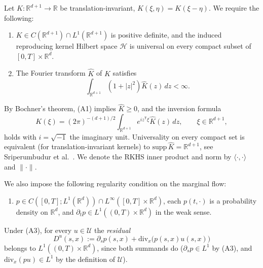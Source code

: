 \documentclass[11pt,leqno]{article}
\theoremstyle{plain}
\theoremstyle{remark}
\theoremstyle{definition}
\numberwithin{equation}{section}
\numberwithin{figure}{section}
\numberwithin{table}{section}
\begin{document}
Let $K:\mathbb{R}^{d+1}\to\mathbb{R}$ be translation-invariant,
$K(\xi,\eta)=K(\xi-\eta)$. 
We require the following: 
\begin{enumerate}
\item[(A1)] $K\in C(\mathbb{R}^{d+1})\cap L^1(\mathbb{R}^{d+1})$ is
positive definite, and the induced reproducing kernel Hilbert space
$\mathcal{H}$ is universal on every compact subset of
$[0,T]\times\mathbb{R}^d$.
\item[(A2)] The Fourier transform $\widehat{K}$ of $K$ satisfies 
\[ 
\int_{\mathbb{R}^{d+1}}(1+|z|^2)\widehat{K}(z)\,dz<\infty. 
\]
\end{enumerate}
By Bochner's theorem, (A1) implies $\widehat{K}\ge 0$, and the
inversion formula
\[
 K(\xi)=(2\pi)^{-(d+1)/2}\int_{\mathbb{R}^{d+1}}e^{iz^{\mathsf{T}}\xi}\widehat{K}(z)\,dz,
 \qquad \xi\in\mathbb{R}^{d+1},
\]
holds with $i=\sqrt{-1}$ the imaginary unit.  Universality on every
compact set is equivalent (for translation-invariant kernels) to
$\mathrm{supp}\,\widehat{K}=\mathbb{R}^{d+1}$, see Sriperumbudur et
al.\ \cite{Sriperumbudur2010}.  We denote the RKHS inner product and norm by
$\langle\cdot,\cdot\rangle$ and $\|\cdot\|$.

We also impose the following regularity condition on the marginal flow:
\begin{enumerate}
\item[(A3)] $p\in C([0,T];L^1(\mathbb{R}^d))\cap L^\infty([0,T]\times\mathbb{R}^d)$,
each $p(t,\cdot)$ is a probability density on $\mathbb{R}^d$, and
$\partial_t p\in L^1((0,T)\times\mathbb{R}^d)$ in the weak sense.
\end{enumerate}
Under (A3), for every $u\in\mathcal{U}$ the \emph{residual}
\begin{equation}\label{eq:residual}
 D^u(s,x):=\partial_s p(s,x)+\mathrm{div}_x\bigl(p(s,x)u(s,x)\bigr)
\end{equation}
belongs to $L^1((0,T)\times\mathbb{R}^d)$, since both summands do
($\partial_s p\in L^1$ by (A3), and $\mathrm{div}_x(pu)\in L^1$
by the definition of $\mathcal{U}$).
\end{document}
